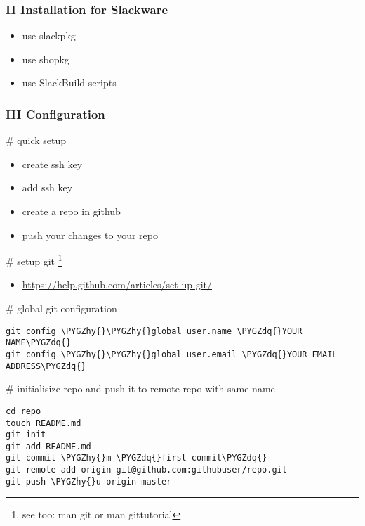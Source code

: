 \documentclass[letterpaper,10pt,english]{sphinxmanual}
\def\PYGZhy{\char`\-}
\def\PYGZdq{\char`\"}
\begin{document}
\subsubsection{II Installation for Slackware}
\label{sdocs/github/github:ii-installation-for-slackware}\begin{itemize}
\item {} 
use slackpkg

\item {} 
use sbopkg

\item {} 
use SlackBuild scripts

\end{itemize}


\subsubsection{III Configuration}
\label{sdocs/github/github:iii-configuration}
\# quick setup
\begin{itemize}
\item {} 
create ssh key

\item {} 
add ssh key

\item {} 
create a repo in github

\item {} 
push your changes to your repo

\end{itemize}

\# setup git \footnote{
see too: man git or man gittutorial
}
\begin{itemize}
\item {} 
\href{https://help.github.com/articles/set-up-git/}{https://help.github.com/articles/set-up-git/}

\end{itemize}

\# global git configuration

\begin{Verbatim}[commandchars=\\\{\}]
git config \PYGZhy{}\PYGZhy{}global user.name \PYGZdq{}YOUR NAME\PYGZdq{}
git config \PYGZhy{}\PYGZhy{}global user.email \PYGZdq{}YOUR EMAIL ADDRESS\PYGZdq{}
\end{Verbatim}

\# initialisize repo and push it to remote repo with same name

\begin{Verbatim}[commandchars=\\\{\}]
cd repo
touch README.md
git init
git add README.md
git commit \PYGZhy{}m \PYGZdq{}first commit\PYGZdq{}
git remote add origin git@github.com:githubuser/repo.git
git push \PYGZhy{}u origin master
\end{Verbatim}
\end{document}
